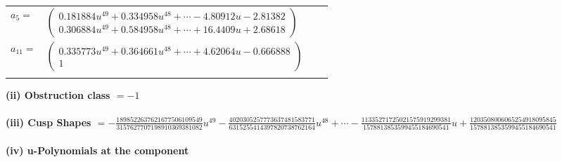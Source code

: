\documentclass[1p]{elsarticle_modified}
\theoremstyle{definition}
\begin{document}
\begin{tabular}{m{7pt} m{180pt} m{7pt} m{180pt} }
\flushright $a_{5}=$&$\begin{pmatrix}0.181884 u^{49}+0.334958 u^{48}+\cdots-4.80912 u-2.81382\\0.306884 u^{49}+0.584958 u^{48}+\cdots+16.4409 u+2.68618\end{pmatrix}$ \\
\flushright $a_{11}=$&$\begin{pmatrix}0.335773 u^{49}+0.364661 u^{48}+\cdots+4.62064 u-0.666888\\1\end{pmatrix}$\\&\end{tabular}
\flushleft \textbf{(ii) Obstruction class $= -1$}\\~\\
\flushleft \textbf{(iii) Cusp Shapes $= -\frac{1898522637621677506109549}{3157627707198910369381082} u^{49}-\frac{4020305257773637481583771}{6315255414397820738762164} u^{48}+\cdots-\frac{11335271725021575919299381}{1578813853599455184690541} u+\frac{1203508006065254918095845}{1578813853599455184690541}$}\\~\\
\newpage\renewcommand{\arraystretch}{1}
\flushleft \textbf{(iv) u-Polynomials at the component}\newline \\
\end{document}
